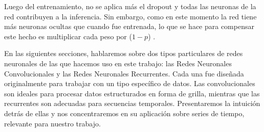 \documentclass[../../main.tex]{subfiles}
\begin{document}
Luego del entrenamiento, no se aplica más el dropout y todas las neuronas de la red
contribuyen a la inferencia. Sin embargo, como en este momento la red tiene más neuronas
ocultas que cuando fue entrenada, lo que se hace para compensar este hecho es multiplicar
cada peso por (\(1-p\)) \cite{prince2024understanding}.

\bigskip
En las siguientes secciones, hablaremos sobre dos tipos particulares de redes neuronales
de las que hacemos uso en este trabajo: las Redes Neuronales Convolucionales y las Redes
Neuronales Recurrentes. Cada una fue diseñada originalmente para trabajar con un tipo
específico de datos. Las convolucionales son ideales para procesar datos estructurados en
forma de grilla, mientras que las recurrentes son adecuadas para secuencias temporales.
Presentaremos la intuición detrás de ellas y nos concentraremos en su aplicación sobre
series de tiempo, relevante para nuestro trabajo.
\end{document}
